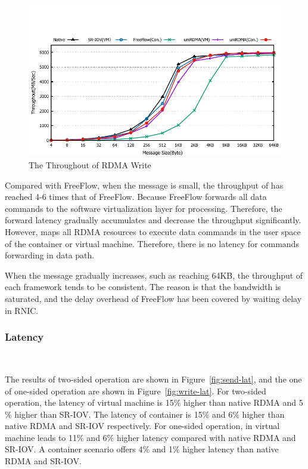 \begin{figure}[!ht]
	\centering
	\includegraphics[width=1.0\linewidth]{images/write-bw.pdf}
	\caption{The Throughout of RDMA Write}
	\label{fig:write-bw}
\end{figure}

Compared with FreeFlow, when the message is small, the throughput of \sys has reached 4-6 times that of FreeFlow. Because FreeFlow forwards all data commands to the software virtualization layer for processing. Therefore, the forward latency gradually accumulates and decrease the throughput significantly. However, \sys maps all RDMA resources to execute data commands in the user space of the container or virtual machine. Therefore, there is no latency for commands forwarding in data path.



When the message gradually increases, such as reaching 64KB, the throughput of each framework tends to be consistent. The reason is that the bandwidth is saturated, and the delay overhead of FreeFlow has been covered by waiting delay in RNIC.

\subsubsection{\textbf{Latency}}
\
\noindent

The results of two-sided operation are shown in Figure~\ref{fig:send-lat}, and the one of one-sided operation are shown in Figure~\ref{fig:write-lat}. For two-sided operation, the latency of virtual machine is 15$\%$ higher than native RDMA and 5$\%$ higher than SR-IOV. The latency of container is 15$\%$ and 6$\%$ higher than native RDMA and SR-IOV respectively. For one-sided operation, \sys in virtual machine leads to 11$\%$ and 6$\%$ higher latency compared with native RDMA and SR-IOV. A container scenario offers 4$\%$ and 1$\%$ higher latency than native RDMA and SR-IOV. 

